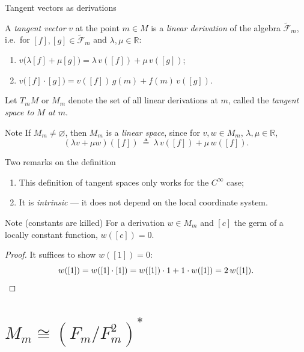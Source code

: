 \documentclass[10pt]{beamer}
\newcommand{\R}{\mathbb{R}}
\newcommand{\F}{\mathcal{F}}
\begin{document}
\begin{frame}{Tangent vectors as derivations}
	\begin{definition}
		A \emph{tangent vector} $v$ at the point $m \in M$ is a
		\emph{linear derivation} of the algebra $\widetilde{\F}_m$, i.e.\
		for $[f], [g] \in \widetilde{\F}_m$ and $\lambda, \mu \in \R$:
		\begin{enumerate}
			\item[(a)] $v\bigl(\lambda [f] + \mu [g]\bigr)
				      = \lambda\, v([f]) + \mu\, v([g])$;
			\item[(b)] $v\bigl([f]\cdot[g]\bigr)
				      = v([f])\, g(m) + f(m)\, v([g])$.
		\end{enumerate}
	\end{definition}
	Let $T_m M$ or $M_m$ denote the set of all linear derivations at $m$,
	called the \emph{tangent space to $M$ at $m$}.
	\begin{block}{Note}
		If $M_m \neq \varnothing$, then $M_m$ is a \emph{linear space},
		since for $v, w \in M_m$, $\lambda, \mu \in \R$,
		\[
			(\lambda v + \mu w)([f])
			\ \triangleq\ \lambda\, v([f]) + \mu\, w([f]).
		\]
	\end{block}
\end{frame}

\begin{frame}{Two remarks on the definition}
	\begin{enumerate}
		\item This definition of tangent spaces only works for the
		      $C^\infty$ case;
		\item It is \emph{intrinsic} --- it does not depend on the local
		      coordinate system.
	\end{enumerate}
	\medskip
	\begin{block}{Note (constants are killed)}
		For a derivation $w \in M_m$ and $[c]$ the germ of a locally
		constant function, $w([c]) = 0$.
	\end{block}
	\begin{proof}
		It suffices to show $w([1]) = 0$:
		\[
			w([1]) = w([1]\cdot[1])
			= w([1]) \cdot 1 + 1 \cdot w([1]) = 2\, w([1]). \qedhere
		\]
	\end{proof}
\end{frame}

\section{$M_m \cong (F_m / F_m^2)^*$}
\end{document}
